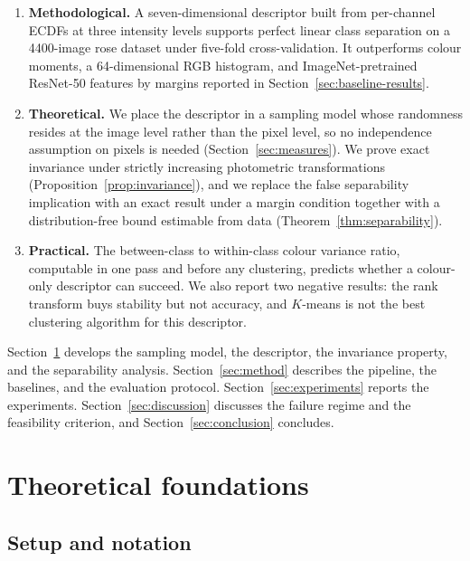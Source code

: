 \documentclass[pdflatex,sn-basic]{sn-jnl}
\theoremstyle{thmstyleone}%
\theoremstyle{thmstyletwo}%
\theoremstyle{thmstylethree}%
\begin{document}
\begin{enumerate}
\item \textbf{Methodological.} A seven-dimensional descriptor built from
per-channel ECDFs at three intensity levels supports perfect linear class
separation on a 4400-image rose dataset under five-fold cross-validation. It
outperforms colour moments, a 64-dimensional RGB histogram, and
ImageNet-pretrained ResNet-50 features by margins reported in
Section~\ref{sec:baseline-results}.

\item \textbf{Theoretical.} We place the descriptor in a sampling model whose
randomness resides at the image level rather than the pixel level, so no
independence assumption on pixels is needed
(Section~\ref{sec:measures}). We prove exact invariance under strictly
increasing photometric transformations
(Proposition~\ref{prop:invariance}), and we replace the false separability
implication with an exact result under a margin condition together with a
distribution-free bound estimable from data
(Theorem~\ref{thm:separability}).

\item \textbf{Practical.} The between-class to within-class colour variance
ratio, computable in one pass and before any clustering, predicts whether a
colour-only descriptor can succeed. We also report two negative results: the
rank transform buys stability but not accuracy, and $K$-means is not the best
clustering algorithm for this descriptor.
\end{enumerate}

Section~\ref{sec:theory} develops the sampling model, the descriptor, the
invariance property, and the separability analysis.
Section~\ref{sec:method} describes the pipeline, the baselines, and the
evaluation protocol. Section~\ref{sec:experiments} reports the experiments.
Section~\ref{sec:discussion} discusses the failure regime and the feasibility
criterion, and Section~\ref{sec:conclusion} concludes.

\section{Theoretical foundations}\label{sec:theory}

\subsection{Setup and notation}\label{sec:notation}
\end{document}
